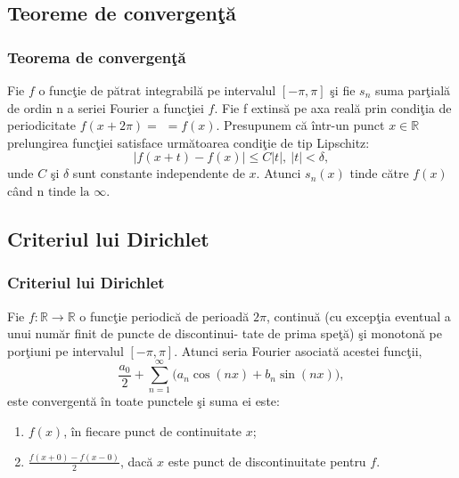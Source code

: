 \documentclass{beamer}
\begin{document}
\begin{frame}
\subsection{Teoreme de convergen\c t\u a}
\frametitle{Teorema de convergen\c t\u a}
\hspace*{20pt}Fie $f$ o func\c tie de p\u atrat integrabil\u a pe intervalul $[-\pi, \pi]$ \c si fie $s_n$ suma par\c tial\u a de ordin n a seriei Fourier a func\c tiei $f$. Fie f extins\u a pe axa real\u a prin condi\c tia de periodicitate $f(x+2\pi)=$ $=f(x)$. Presupunem c\u a \^intr-un punct $x \in \mathbb{R}$ prelungirea func\c tiei satisface urm\u atoarea condi\c tie de tip Lipschitz:
\begin{equation*}
\left| f(x+t)-f(x) \right| \leq C\left|t\right|, \:\left|t\right|<\delta,
\end{equation*}
unde $C$ \c si $\delta$ sunt constante independente de $x$. 
Atunci $s_n(x)$ tinde c\u atre $f(x)$ c\^ and n$\text{ tinde la }  \infty$.
\end{frame}

\begin{frame}
\subsection*{Criteriul lui Dirichlet}
\frametitle{Criteriul lui Dirichlet}
\hspace*{20pt}Fie $f:\mathbb{R}\rightarrow \mathbb{R}$ o func\c tie periodic\u a de perioad\u a $2\pi$, continu\u a (cu excep\c tia eventual a unui num\u ar finit de puncte de discontinui- tate de prima spe\c t\u a) \c si monoton\u a pe por\c tiuni pe intervalul $[-\pi, \pi]$. Atunci seria Fourier asociat\u a acestei func\c tii, 
\begin{equation*}
\frac{a_0}{2} + \sum_{n=1}^\infty \Big(a_n\cos(nx) + b_n\sin(nx)\Big),
\end{equation*} 
este convergent\u a \^ in toate punctele \c si suma ei este:
\begin{enumerate}
\item $f(x)$, \^ in fiecare punct de continuitate $x$;
\item $\frac{f(x+0)-f(x-0)}{2}$, dac\u a $x$ este punct de discontinuitate pentru $f$.
\end{enumerate}
\end{frame}
\end{document}
